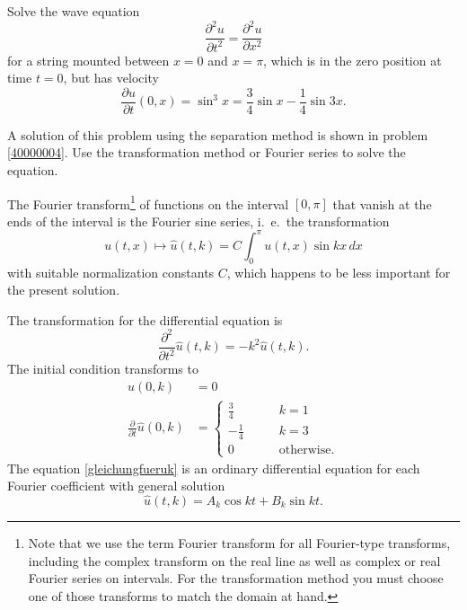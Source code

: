 Solve the wave equation
\[
\frac{\partial^2 u}{\partial t^2}=\frac{\partial^2 u}{\partial x^2}
\]
for a string mounted between $x=0$ and $x=\pi$,
which is in the zero position at time $t=0$, but has velocity
\[
\frac{\partial u}{\partial t}(0, x)
=
\sin^3 x=\frac34\sin x-\frac14\sin 3x.
\]

\begin{hinweis}
A solution of this problem using the separation method is shown in 
problem \ref{40000004}.
Use the transformation method or Fourier series to solve the equation.
\end{hinweis}

\begin{loesung}
The Fourier transform\footnote{Note that we use the term Fourier transform
for all Fourier-type transforms, including the complex transform on the
real line as well as complex or real Fourier series on intervals.
For the transformation method you must choose one of those transforms
to match the domain at hand.}
of functions on the interval $[0,\pi]$ that vanish
at the ends of the interval is the Fourier sine series, i.~e.~the
transformation
\[
u(t,x) \mapsto \hat u(t, k)= C\int_0^{\pi} u(t,x)\sin kx\, dx
\]
with suitable normalization constants $C$, which happens to be less important
for the present solution.

The transformation for the differential equation is
\begin{equation}
\frac{\partial^2}{\partial t^2}\hat u(t,k)
=-k^2\hat u(t,k).
\label{gleichungfueruk}
\end{equation}
The initial condition transforms to
\begin{align}
\hat u(0,k)&=0\label{40000004:anfbedu}\\
\frac{\partial}{\partial t}\hat u(0,k)&=
\begin{cases}
\frac34&\qquad k= 1\\
-\frac14&\qquad k= 3\\
0&\qquad \text{otherwise.}
\end{cases}
\label{40000004:anfbedudot}
\end{align}
The equation
\eqref{gleichungfueruk}
is an ordinary differential equation for each Fourier coefficient
with general solution
\[
\hat u(t,k)=A_k\cos kt+B_k\sin kt.
\]


\end{loesung}
